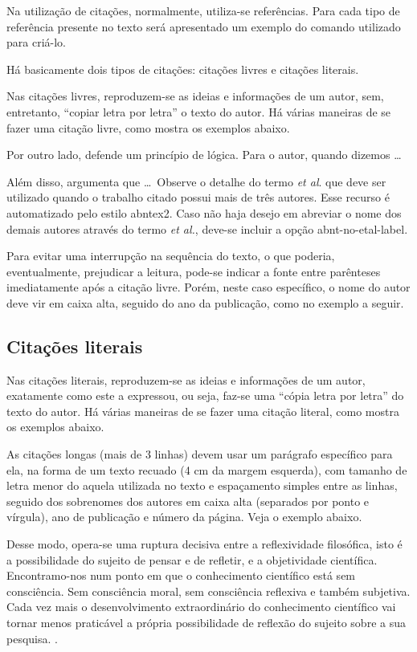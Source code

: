 Na utilização de citações, normalmente, utiliza-se referências.
Para cada tipo de referência presente no texto será apresentado um exemplo do comando utilizado para criá-lo.

Há basicamente dois tipos de citações: citações livres e citações literais.

Nas citações livres, reproduzem-se as ideias e informações de um autor, sem, entretanto, ``copiar letra por letra'' o texto do autor.
Há várias maneiras de se fazer uma citação livre, como mostra os exemplos abaixo.

Por outro lado, \textcite{maturana:2003} defende um princípio de lógica.
Para o autor, quando dizemos \ldots

Além disso, \textcite{teste:2004} argumenta que \ldots\mbox{ }Observe o detalhe do termo \textit{et al}.
que deve ser utilizado quando o trabalho citado possui mais de três autores.
Esse recurso é automatizado pelo estilo {\ttfamily abntex2}.
Caso não haja desejo em abreviar o nome dos demais autores através do termo \textit{et al.}, deve-se incluir a opção {\ttfamily abnt-no-etal-label}.

Para evitar uma interrupção na sequência do texto, o que poderia, eventualmente, prejudicar a leitura, pode-se indicar a fonte entre parênteses imediatamente após a citação livre.
Porém, neste caso específico, o nome do autor deve vir em caixa alta, seguido do ano da publicação, como no exemplo a seguir.

\cite{BibTeX2009}

\subsection{Citações literais}\label{citacoesLiterais}
Nas citações literais, reproduzem-se as ideias e informações de um autor, exatamente como este a expressou, ou seja, faz-se uma ``cópia letra por letra'' do texto do autor.
Há várias maneiras de se fazer uma citação literal, como mostra os exemplos abaixo.

As citações longas (mais de 3 linhas) devem usar um parágrafo específico para ela, na forma de um texto recuado (4 cm da margem esquerda), com tamanho de letra menor do aquela utilizada no texto e espaçamento simples entre as linhas, seguido dos sobrenomes dos autores em caixa alta (separados por ponto e vírgula), ano de publicação e número da página.
Veja o exemplo abaixo.

\begin{citacao}
Desse modo, opera-se uma ruptura decisiva entre a reflexividade filosófica, isto é a possibilidade do sujeito de pensar e de refletir, e a objetividade científica.
Encontramo-nos num ponto em que o conhecimento científico está sem consciência.
Sem consciência moral, sem consciência reflexiva e também subjetiva.
Cada vez mais o desenvolvimento extraordinário do conhecimento científico vai tornar menos praticável a própria possibilidade de reflexão do sujeito sobre a sua pesquisa. \cite[p.28]{morinmoigne:2000}.
\end{citacao}

